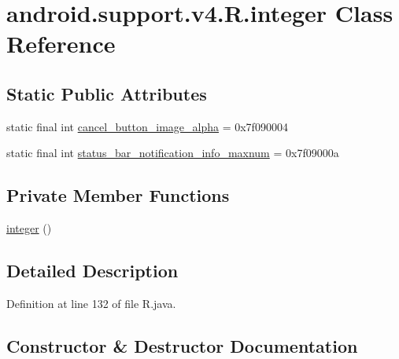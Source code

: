 \hypertarget{classandroid_1_1support_1_1v4_1_1_r_1_1integer}{}\section{android.\+support.\+v4.\+R.\+integer Class Reference}
\label{classandroid_1_1support_1_1v4_1_1_r_1_1integer}
\subsection*{Static Public Attributes}
\begin{DoxyCompactItemize}
\item 
static final int \mbox{\hyperlink{classandroid_1_1support_1_1v4_1_1_r_1_1integer_af941eedc86107cf9f1e848c4db1378ba}{cancel\+\_\+button\+\_\+image\+\_\+alpha}} = 0x7f090004
\item 
static final int \mbox{\hyperlink{classandroid_1_1support_1_1v4_1_1_r_1_1integer_aaadc2534ee13f89701f07f74bc5f013a}{status\+\_\+bar\+\_\+notification\+\_\+info\+\_\+maxnum}} = 0x7f09000a
\end{DoxyCompactItemize}
\subsection*{Private Member Functions}
\begin{DoxyCompactItemize}
\item 
\mbox{\hyperlink{classandroid_1_1support_1_1v4_1_1_r_1_1integer_a31e8f197a66a58106b0854d93651da2e}{integer}} ()
\end{DoxyCompactItemize}


\subsection{Detailed Description}


Definition at line 132 of file R.\+java.



\subsection{Constructor \& Destructor Documentation}
\mbox{\label{classandroid_1_1support_1_1v4_1_1_r_1_1integer_a31e8f197a66a58106b0854d93651da2e}} 
